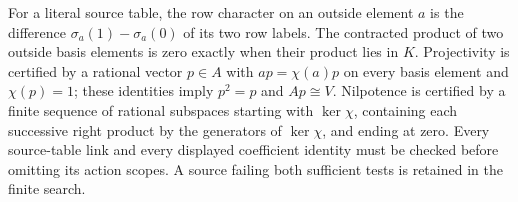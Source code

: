 \begin{remark*}
For a literal source table, the row character on an outside element
$a$ is the difference $\sigma_a(1)-\sigma_a(0)$ of its two row labels.
The contracted product of two outside basis elements is zero exactly
when their product lies in $K$.  Projectivity is certified by a rational
vector $p\in A$ with $ap=\chi(a)p$ on every basis element and
$\chi(p)=1$; these identities imply $p^2=p$ and $Ap\cong V$.
Nilpotence is certified by a finite sequence of rational subspaces
starting with $\ker\chi$, containing each successive right product by
the generators of $\ker\chi$, and ending at zero.  Every source-table
link and every displayed coefficient identity must be checked before
omitting its action scopes.  A source failing both sufficient tests is
retained in the finite search.
\end{remark*}
